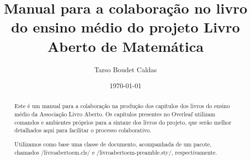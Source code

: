 \documentclass{article}
\title{Manual para a colaboração no livro do ensino médio do projeto
	Livro Aberto de Matemática}
\author{Tarso Boudet Caldas}
\date{\today}
\begin{document}
\maketitle

\begin{abstract}
	Este é um manual para a colaboração na produção dos capítulos dos
	livros do ensino médio da Associação Livro Aberto. Os capítulos
	presentes no Overleaf utilizam comandos e ambientes próprios para a
	sintaxe dos livros do projeto, que serão melhor detalhados aqui para
	facilitar o processo colaborativo.

	Utilizamos como base uma classe de documento, acompanhada de um pacote,
	chamados \latexinline/livroabertoem.cls/ e
	\latexinline/livroabertoem-preamble.sty/, respectivamente.
\end{abstract}


\tableofcontents\clearpage








\end{document}
